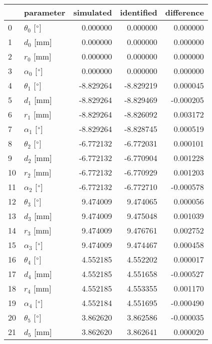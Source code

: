 \documentclass{standalone}%
\begin{document}
%
\normalsize%
\begin{tabular}{llrrr}
\toprule
{} &                 parameter & simulated & identified & difference \\
\midrule
0  &  $\theta_{0}$ [$\degree$] &  0.000000 &   0.000000 &   0.000000 \\
1  &              $d_{0}$ [mm] &  0.000000 &   0.000000 &   0.000000 \\
2  &              $r_{0}$ [mm] &  0.000000 &   0.000000 &   0.000000 \\
3  &  $\alpha_{0}$ [$\degree$] &  0.000000 &   0.000000 &   0.000000 \\
4  &  $\theta_{1}$ [$\degree$] & -8.829264 &  -8.829219 &   0.000045 \\
5  &              $d_{1}$ [mm] & -8.829264 &  -8.829469 &  -0.000205 \\
6  &              $r_{1}$ [mm] & -8.829264 &  -8.826092 &   0.003172 \\
7  &  $\alpha_{1}$ [$\degree$] & -8.829264 &  -8.828745 &   0.000519 \\
8  &  $\theta_{2}$ [$\degree$] & -6.772132 &  -6.772031 &   0.000101 \\
9  &              $d_{2}$ [mm] & -6.772132 &  -6.770904 &   0.001228 \\
10 &              $r_{2}$ [mm] & -6.772132 &  -6.770929 &   0.001203 \\
11 &  $\alpha_{2}$ [$\degree$] & -6.772132 &  -6.772710 &  -0.000578 \\
12 &  $\theta_{3}$ [$\degree$] &  9.474009 &   9.474065 &   0.000056 \\
13 &              $d_{3}$ [mm] &  9.474009 &   9.475048 &   0.001039 \\
14 &              $r_{3}$ [mm] &  9.474009 &   9.476761 &   0.002752 \\
15 &  $\alpha_{3}$ [$\degree$] &  9.474009 &   9.474467 &   0.000458 \\
16 &  $\theta_{4}$ [$\degree$] &  4.552185 &   4.552202 &   0.000017 \\
17 &              $d_{4}$ [mm] &  4.552185 &   4.551658 &  -0.000527 \\
18 &              $r_{4}$ [mm] &  4.552185 &   4.553355 &   0.001170 \\
19 &  $\alpha_{4}$ [$\degree$] &  4.552184 &   4.551695 &  -0.000490 \\
20 &  $\theta_{5}$ [$\degree$] &  3.862620 &   3.862586 &  -0.000035 \\
21 &              $d_{5}$ [mm] &  3.862620 &   3.862641 &   0.000020 \\

\end{tabular}
\end{document}

